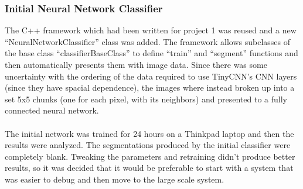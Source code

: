\documentclass[12pt]{article}
\begin{document}
\subsubsection{Initial Neural Network Classifier}
	The C++ framework which had been written for project 1 was reused and a new “NeuralNetworkClassifier” class was added.  The framework allows subclasses of the base class “classifierBaseClass” to define “train” and “segment” functions and then automatically presents them with image data.  Since there was some uncertainty with the ordering of the data required to use TinyCNN's CNN layers (since they have spacial dependence), the images where instead broken up into a set 5x5 chunks (one for each pixel, with its neighbors) and presented to a fully connected neural network.\\
\\
	The initial network was trained for 24 hours on a Thinkpad laptop and then the results were analyzed.  The segmentations produced by the initial classifier were completely blank.  Tweaking the parameters and retraining didn't produce better results, so it was decided that it would be preferable to start with a system that was easier to debug and then move to the large scale system.
\end{document}
